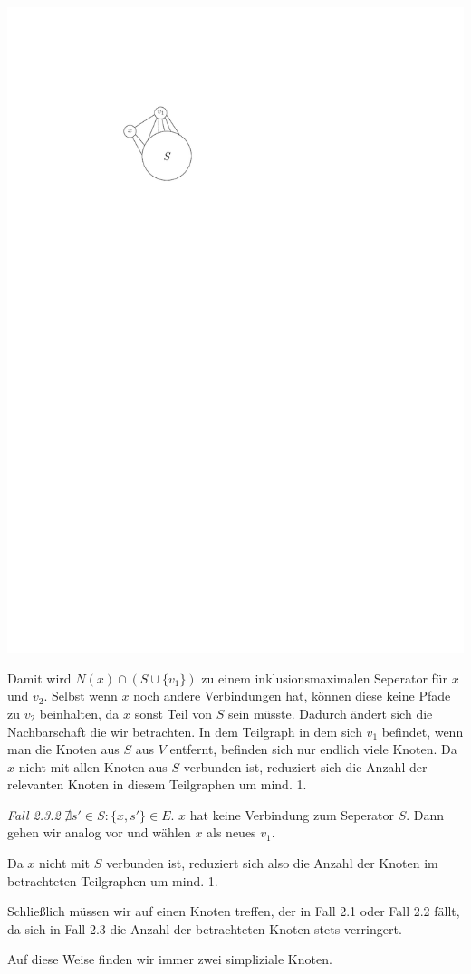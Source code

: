 \begin{center}
    \vspace{1ex}
    \includegraphics[page=1]{fig/03-2b-xtos}
\end{center}

Damit wird $N(x) \cap (S \cup \{v_1\})$ zu einem inklusionsmaximalen Seperator für $x$ und $v_2$.
Selbst wenn $x$ noch andere Verbindungen hat, können diese keine Pfade zu $v_2$ beinhalten, da $x$ sonst Teil von $S$ sein müsste.
Dadurch ändert sich die Nachbarschaft die wir betrachten. In dem Teilgraph in dem sich $v_1$ befindet, wenn man die Knoten aus $S$ aus $V$ entfernt, befinden sich nur endlich viele Knoten.
Da $x$ nicht mit allen Knoten aus $S$ verbunden ist, reduziert sich die Anzahl der relevanten Knoten in diesem Teilgraphen um mind. 1.

\emph{Fall 2.3.2}
$\nexists s' \in S \colon \{x,s'\} \in E$. $x$ hat keine Verbindung zum Seperator $S$.
Dann gehen wir analog vor und wählen $x$ als neues $v_1$.

Da $x$ nicht mit $S$ verbunden ist, reduziert sich also die Anzahl der Knoten im betrachteten Teilgraphen um mind. 1.

Schließlich müssen wir auf einen Knoten treffen, der in Fall 2.1 oder Fall 2.2 fällt, da sich in Fall 2.3 die Anzahl der betrachteten Knoten stets verringert.

Auf diese Weise finden wir immer zwei simpliziale Knoten.


